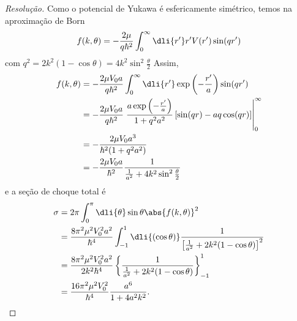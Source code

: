 \begin{proof}[Resolução]
   Como o potencial de Yukawa é esfericamente simétrico, temos na aproximação de Born
   \begin{equation*}
      f(k, \theta) = -\frac{2\mu}{q \hbar^2}\int_{0}^\infty \dli{r'} r' V(r') \sin(qr')
   \end{equation*}
   com \(q^2 = 2k^2(1 - \cos\theta) = 4k^2 \sin^2\frac{\theta}{2}\) Assim,
   \begin{align*}
      f(k,\theta) &= -\frac{2\mu V_0 a}{q \hbar^2} \int_0^\infty \dli{r'} \exp\left(-\frac{r'}{a}\right) \sin(qr')\\
                  &= -\frac{2\mu V_0 a}{q \hbar^2} \left.\frac{a\exp\left(-\frac{r'}{a}\right)}{1 + q^2a^2}\left[\sin(qr) - aq \cos(qr)\right]\right|_0^\infty\\
                  &= -\frac{2\mu V_0 a^3}{\hbar^2(1 + q^2 a^2)}\\
                  &= - \frac{2\mu V_0 a}{\hbar^2} \frac{1}{\frac1{a^2} + 4k^2\sin^2\frac\theta2}
   \end{align*}
   e a seção de choque total é
   \begin{align*}
      \sigma &= 2\pi\int_{0}^\pi \dli{\theta} \sin\theta \abs{f(k,\theta)}^2\\
             &= \frac{8\pi^2 \mu^2V_0^2a^2}{\hbar^4} \int_{-1}^{1} \dli{(\cos\theta)} \frac{1}{\left[\frac{1}{a^2} + 2k^2(1 - \cos\theta) \right]^2}\\
             &= \frac{8\pi^2 \mu^2V_0^2a^2}{2k^2\hbar^4} \left\{\frac{1}{\frac{1}{a^2} + 2k^2 (1 - \cos\theta)}\right\}_{-1}^{1}\\
             &= \frac{16\pi^2 \mu^2V_0^2}{\hbar^4} \frac{a^6}{1 + 4a^2k^2}.
   \end{align*}


\end{proof}
